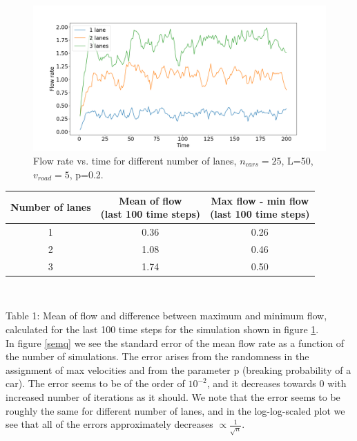 \documentclass[a4paper,12pt]{article}
\begin{document}
\begin{figure}[H]
	\centering
        \includegraphics[scale=0.45]{fig1.png}
    \caption{Flow rate vs. time for different number of lanes, $n_{cars}=25$, L=50, $v_{road}=5$, p=0.2.}
    \label{fig1}
\end{figure}

\begin{center}
\def\arraystretch{1.5}
\begin{tabular}{ |c|c|c| } 
 \hline
	Number of lanes & \makecell{Mean of flow\\ (last 100 time steps)} & \makecell{Max flow - min flow\\ (last 100 time steps)}\\
 \hline
	 1 & 0.36 & 0.26 \\
	 2 & 1.08 & 0.46 \\
	 3 & 1.74 &  0.50 \\
 \hline
\end{tabular}\\
\end{center}
Table 1: Mean of flow and difference between maximum and minimum flow, calculated for the last 100 time steps for the simulation shown in figure \ref{fig1}.\\

In figure \ref{semq} we see the standard error of the mean flow rate as a function of the number of simulations. The error arises from the randomness in the assignment of max velocities and from the parameter p (breaking probability of a car). The error seems to be of the order of $10^{-2}$, and it decreases towards 0 with increased number of iterations as it should. We note that the error seems to be roughly the same for different number of lanes, and in the log-log-scaled plot we see that all of the errors approximately decreases $\propto \frac{1}{\sqrt{n}}$.
\end{document}
